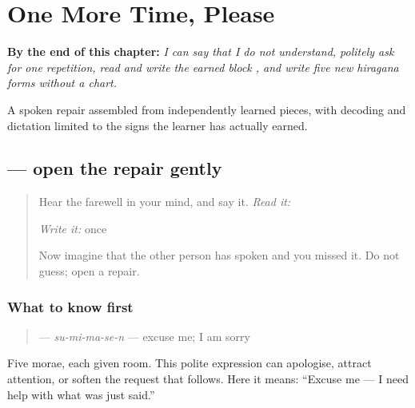 
\chapter{One More Time, Please}
\label{ch:ja-repeat-please}

\begin{chapteropening}
\textbf{By the end of this chapter:} \emph{I can say that I do not understand, politely ask for one repetition, read and write the earned block , and write five new hiragana forms without a chart.}

A spoken repair assembled from independently learned pieces, with decoding and dictation limited to the signs the learner has actually earned.
\end{chapteropening}

\section[\texorpdfstring{\ja{すみません} (sumimasen)}{すみません (sumimasen)}]{ — open the repair gently}

\label{lesson:JA-C09-sumimasen}



\begin{quote}
Hear the farewell in your mind, and say it. \emph{Read it:} \textbf{}

\emph{Write it:} \textbf{} once

Now imagine that the other person has spoken and you missed it. Do not guess; open a repair.
\end{quote}

\subsection*{What to know first}
\begin{quote}
\textbf{} — \emph{su-mi-ma-se-n} — excuse me; I am sorry
\end{quote}

Five morae, each given room. This polite expression can apologise, attract attention, or soften the request that follows. Here it means: “Excuse me — I need help with what was just said.”

